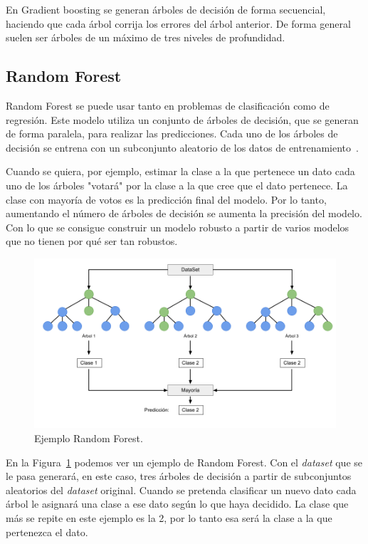 \documentclass[a4paper, 12pt]{book}
\begin{document}
En Gradient boosting se generan árboles de decisión de forma secuencial, haciendo que cada árbol corrija los errores del árbol anterior. De forma general suelen ser árboles de un máximo de tres niveles de profundidad.

\subsection{Random Forest}
\label{subsec:random_forest}

Random Forest se puede usar tanto en problemas de clasificación como de regresión. Este modelo utiliza un conjunto de árboles de decisión, que se generan de forma paralela, para realizar las predicciones. Cada uno de los árboles de decisión se entrena con un subconjunto aleatorio de los datos de entrenamiento~\cite{James2021}. 

Cuando se quiera, por ejemplo, estimar la clase a la que pertenece un dato cada uno de los árboles "votará" por la clase a la que cree que el dato pertenece. La clase con mayoría de votos es la predicción final del modelo. Por lo tanto, aumentando el número de árboles de decisión se aumenta la precisión del modelo. Con lo que se consigue construir un modelo robusto a partir de varios modelos que no tienen por qué ser tan robustos.

\begin{figure}[htb]
  \centering
  \includegraphics[width=14cm, keepaspectratio]{img/ejemplo_randomForest.png}
  \caption{Ejemplo Random Forest.}\label{fig:ejemplo_rforest}
\end{figure}

En la Figura~\ref{fig:ejemplo_rforest} podemos ver un ejemplo de Random Forest. Con el \textit{dataset} que se le pasa generará, en este caso, tres árboles de decisión a partir de subconjuntos aleatorios del \textit{dataset} original. Cuando se pretenda clasificar un nuevo dato cada árbol le asignará una clase a ese dato según lo que haya decidido. La clase que más se repite en este ejemplo es la 2, por lo tanto esa será la clase a la que pertenezca el dato.
\end{document}
